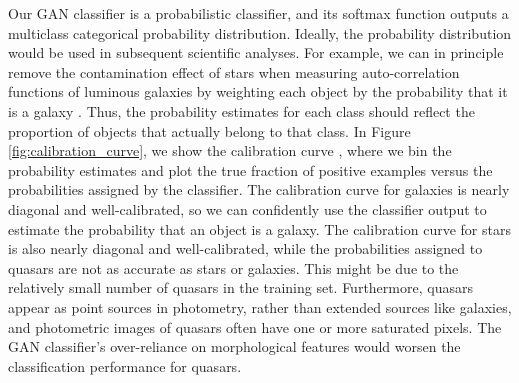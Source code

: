 \documentclass[fleqn,usenatbib]{mnras}
\begin{document}
Our GAN classifier is a probabilistic classifier, and its softmax function outputs a multiclass categorical
probability distribution.
Ideally, the probability distribution would be used in subsequent scientific analyses.
For example, we can in principle remove the contamination effect of stars when measuring auto-correlation functions of
luminous galaxies by weighting each object by the probability that it is a galaxy \citep{ross2011ameliorating}.
Thus, the probability estimates for each class should reflect the proportion of objects that actually belong to that class.
In Figure \ref{fig:calibration_curve}, we show the calibration curve \citep[or reliability curves;][]{degroot1983comparison},
where we bin the probability estimates and plot the true fraction of positive examples versus the probabilities assigned
by the classifier.
The calibration curve for galaxies is nearly diagonal and well-calibrated, so we can confidently use the
classifier output to estimate the probability that an object is a galaxy.
The calibration curve for stars is also nearly diagonal and well-calibrated,
while the probabilities assigned to quasars are not as accurate as stars or galaxies.
This might be due to the relatively small number of quasars in the training set.
Furthermore, quasars appear as point sources in photometry, rather than extended sources like galaxies,
and photometric images of quasars often have one or more saturated pixels.
The GAN classifier's over-reliance on morphological features would worsen the classification performance for quasars.
\end{document}
